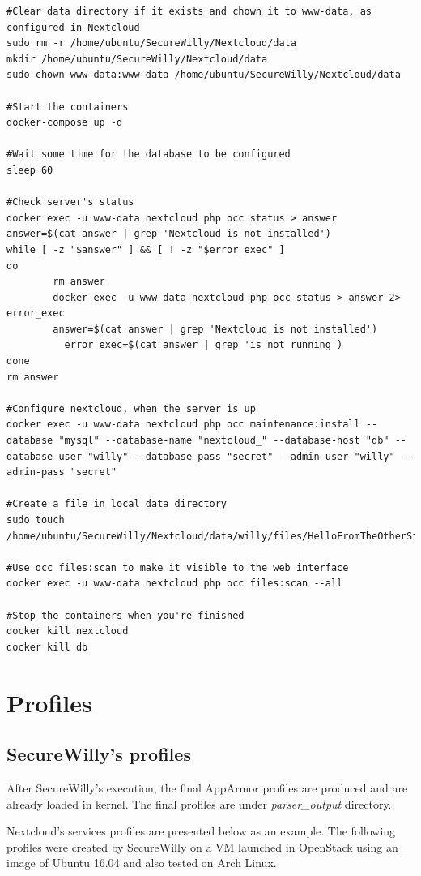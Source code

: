 \begin{lstlisting}[style=bashscript, caption={Test plan used in Nextcloud's project}]
#Clear data directory if it exists and chown it to www-data, as configured in Nextcloud
sudo rm -r /home/ubuntu/SecureWilly/Nextcloud/data
mkdir /home/ubuntu/SecureWilly/Nextcloud/data
sudo chown www-data:www-data /home/ubuntu/SecureWilly/Nextcloud/data

#Start the containers
docker-compose up -d

#Wait some time for the database to be configured
sleep 60

#Check server's status
docker exec -u www-data nextcloud php occ status > answer
answer=$(cat answer | grep 'Nextcloud is not installed')
while [ -z "$answer" ] && [ ! -z "$error_exec" ]
do
        rm answer
        docker exec -u www-data nextcloud php occ status > answer 2> error_exec
        answer=$(cat answer | grep 'Nextcloud is not installed')
		  error_exec=$(cat answer | grep 'is not running')
done
rm answer

#Configure nextcloud, when the server is up
docker exec -u www-data nextcloud php occ maintenance:install --database "mysql" --database-name "nextcloud_" --database-host "db" --database-user "willy" --database-pass "secret" --admin-user "willy" --admin-pass "secret"

#Create a file in local data directory
sudo touch /home/ubuntu/SecureWilly/Nextcloud/data/willy/files/HelloFromTheOtherSide

#Use occ files:scan to make it visible to the web interface
docker exec -u www-data nextcloud php occ files:scan --all

#Stop the containers when you're finished
docker kill nextcloud
docker kill db
\end{lstlisting}

\section{Profiles}
\subsection{SecureWilly's profiles}
After SecureWilly's execution, the final AppArmor profiles are produced and are already loaded in kernel. The final profiles are under \textit{parser\_output} directory.

Nextcloud's services profiles are presented below as an example. The following profiles were created by SecureWilly on a VM launched in OpenStack using an image of Ubuntu 16.04 and also tested on Arch Linux.

